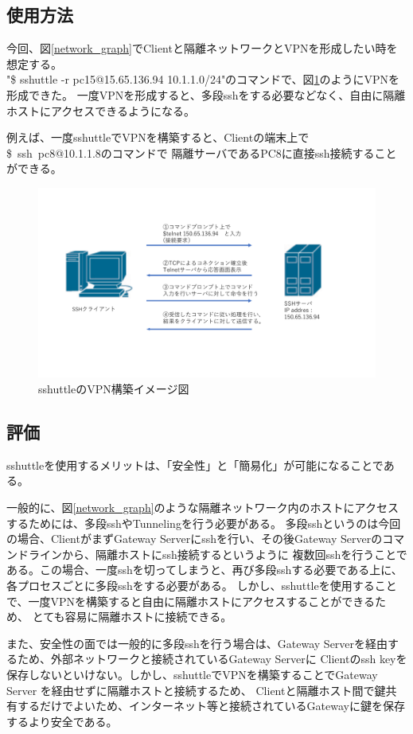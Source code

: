\documentclass[11pt,a4j,titlepage]{jreport}
\begin{document}
\subsection*{使用方法}
今回、図\ref{network_graph}でClientと隔離ネットワークとVPNを形成したい時を想定する。\\
"\$ sshuttle -r pc15@15.65.136.94 10.1.1.0/24"のコマンドで、図\ref{sshuttleのVPN構築イメージ図}のようにVPNを形成できた。
一度VPNを形成すると、多段sshをする必要などなく、自由に隔離ホストにアクセスできるようになる。\par
例えば、一度sshuttleでVPNを構築すると、Clientの端末上で\\ \mbox{\$ ssh pc8@10.1.1.8}のコマンドで
隔離サーバであるPC8に直接ssh接続することができる。


\begin{figure}[h]
    \centering
    \includegraphics[width=1.0\textwidth, page=7]{graphs/network_archtecture.pdf}
    \caption{sshuttleのVPN構築イメージ図}
    \label{sshuttleのVPN構築イメージ図}
\end{figure}


\subsection*{評価}
sshuttleを使用するメリットは、「安全性」と「簡易化」が可能になることである。\par
一般的に、図\ref{network_graph}のような隔離ネットワーク内のホストにアクセスするためには、多段sshやTunnelingを行う必要がある。
多段sshというのは今回の場合、ClientがまずGateway Serverにsshを行い、その後Gateway Serverのコマンドラインから、隔離ホストにssh接続するというように
複数回sshを行うことである。この場合、一度sshを切ってしまうと、再び多段sshする必要である上に、各プロセスごとに多段sshをする必要がある。
しかし、sshuttleを使用することで、一度VPNを構築すると自由に隔離ホストにアクセスすることができるため、
とても容易に隔離ホストに接続できる。\par
また、安全性の面では一般的に多段sshを行う場合は、Gateway Serverを経由するため、外部ネットワークと接続されているGateway Serverに
Clientのssh keyを保存しないといけない。しかし、sshuttleでVPNを構築することでGateway Server を経由せずに隔離ホストと接続するため、
Clientと隔離ホスト間で鍵共有するだけでよいため、インターネット等と接続されているGatewayに鍵を保存するより安全である。
\end{document}
